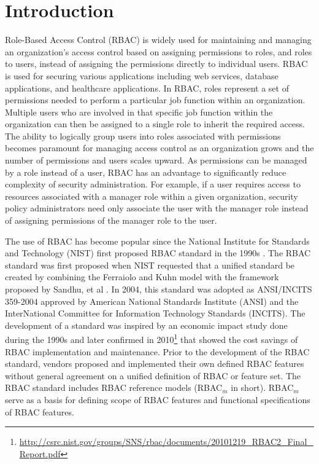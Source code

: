 \section{Introduction} \label{sec:introduction}

Role-Based Access Control (RBAC) is widely used for maintaining and managing an organization's 
access control based on assigning permissions to roles, and roles to users, instead of 
assigning the permissions directly to individual users.
RBAC is used for securing 
various applications including web services, database applications, and healthcare applications. 
In RBAC, roles represent a set of permissions needed to perform a particular job function within an organization.  
Multiple users who are involved in that specific job function within the organization can then be 
assigned to a single role to inherit the required access. 
The ability to logically group users into roles associated with permissions becomes paramount for managing access control as an organization grows
and the number of permissions and users scales upward.
As permissions can be managed by a role instead of a user, RBAC has an advantage to significantly reduce complexity of security
administration.
For example, if a user requires access to resources 
associated with a manager role within a given organization, security policy administrators need only associate the user with the manager role instead
of assigning permissions of the manager role to the user.


The use of RBAC has become popular since the National Institute for Standards and Technology (NIST) 
first proposed RBAC standard in the 1990s \cite{o20102010}.
The RBAC standard was first proposed when NIST 
requested that a unified standard be created by combining the Ferraiolo and Kuhn model \cite{ferraiolokuhn} with the framework 
proposed by Sandhu, et al \cite{sandhu1996role}.  
In 2004, this standard was adopted as ANSI/INCITS 359-2004 approved by American National Standards Institute (ANSI) and the InterNational Committee for Information Technology Standards (INCITS). 
The development of a standard was inspired by an economic impact study done during the 1990s and later confirmed in 2010\footnote{\url{http://csrc.nist.gov/groups/SNS/rbac/documents/20101219_RBAC2_Final_Report.pdf}} that showed the cost savings of RBAC implementation and maintenance. 
Prior to the development of the RBAC standard, vendors proposed and implemented their own defined RBAC features without general agreement on a unified definition of RBAC or feature set. The RBAC standard includes RBAC reference models (RBAC$_{m}$ in short). RBAC$_{m}$ serve as a basis for defining scope of RBAC features and functional specifications of RBAC features.

